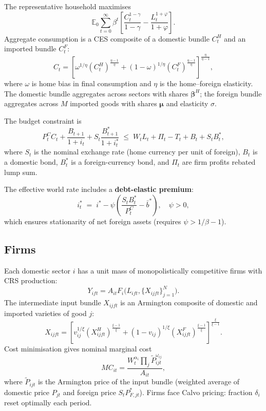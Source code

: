 \documentclass[11pt,a4paper]{article}
\newcommand{\E}{\mathbb{E}}
\begin{document}
The representative household maximises
\begin{equation}
\E_0\sum_{t=0}^{\infty}\beta^t\!\left[\frac{C_t^{1-\gamma}}{1-\gamma}-\frac{L_t^{1+\varphi}}{1+\varphi}\right].
\end{equation}
Aggregate consumption is a CES composite of a domestic bundle $C^H_t$ and an
imported bundle $C^F_t$:
\begin{equation}
C_t=\left[\omega^{1/\eta}(C^H_t)^{\frac{\eta-1}{\eta}}+(1-\omega)^{1/\eta}(C^F_t)^{\frac{\eta-1}{\eta}}\right]^{\frac{\eta}{\eta-1}},
\end{equation}
where $\omega$ is home bias in final consumption and $\eta$ is the
home–foreign elasticity.  The domestic bundle aggregates across sectors
with shares $\bm\beta^H$; the foreign bundle aggregates across $M$ imported
goods with shares $\bm\mu$ and elasticity $\sigma$.

The budget constraint is
\begin{equation}
P^C_tC_t+\frac{B_{t+1}}{1+i_t}+S_t\frac{B^*_{t+1}}{1+i^{*}_t}
\;\leq\; W_tL_t+\Pi_t-T_t+B_t+S_tB^*_t,
\end{equation}
where $S_t$ is the nominal exchange rate (home currency per unit of foreign),
$B_t$ is a domestic bond, $B^*_t$ is a foreign-currency bond, and
$\Pi_t$ are firm profits rebated lump sum.

The effective world rate includes a \textbf{debt-elastic premium}:
\begin{equation}
i^{*}_t\;=\;i^*-\psi\!\left(\frac{S_tB^*_t}{P^C_t}-\bar b^*\right),
\quad\psi>0,
\label{eq:premium}
\end{equation}
which ensures stationarity of net foreign assets (requires $\psi>1/\beta-1$).

\subsection{Firms}

Each domestic sector $i$ has a unit mass of monopolistically competitive firms
with CRS production:
\begin{equation}
Y_{ift}=A_{it}F_i\!\bigl(L_{ift},\{X_{ijft}\}_{j=1}^N\bigr).
\end{equation}
The intermediate input bundle $X_{ijft}$ is an Armington composite of domestic
and imported varieties of good $j$:
\begin{equation}
X_{ijft}=\left[v_{ij}^{1/\xi}(X^H_{ijft})^{\frac{\xi-1}{\xi}}+(1-v_{ij})^{1/\xi}(X^F_{ijft})^{\frac{\xi-1}{\xi}}\right]^{\frac{\xi}{\xi-1}}.
\end{equation}
Cost minimisation gives nominal marginal cost
\begin{equation}
MC_{it}=\frac{W_t^{\alpha_i}\prod_j\tilde P_{ijt}^{\omega_{ij}}}{A_{it}},
\label{eq:mc_structural}
\end{equation}
where $\tilde P_{ijt}$ is the Armington price of the input bundle (weighted
average of domestic price $P_{jt}$ and foreign price $S_tP^*_{F,jt}$).
Firms face Calvo pricing: fraction $\delta_i$ reset optimally each period.
\end{document}
